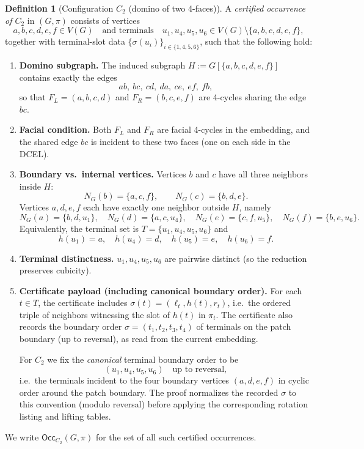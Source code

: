\documentclass[12pt]{article}
\theoremstyle{definition}
\newtheorem{definition}[theorem]{Definition}
\begin{document}
\begin{definition}[Configuration $C_2$ (domino of two 4-faces)]
\label{def:C2-occ}
A \emph{certified occurrence of $C_2$} in $(G,\pi)$ consists of vertices
\[
a,b,c,d,e,f\in V(G)\quad\text{and terminals}\quad u_1,u_4,u_5,u_6\in V(G)\setminus\{a,b,c,d,e,f\},
\]
together with terminal-slot data $\{\sigma(u_i)\}_{i\in\{1,4,5,6\}}$,
such that the following hold:

\begin{enumerate}
\item \textbf{Domino subgraph.}
The induced subgraph $H:=G[\{a,b,c,d,e,f\}]$ contains exactly the edges
\[
ab,\ bc,\ cd,\ da,\ ce,\ ef,\ fb,
\]
so that $F_L=(a,b,c,d)$ and $F_R=(b,c,e,f)$ are 4-cycles sharing the edge $bc$.

\item \textbf{Facial condition.}
Both $F_L$ and $F_R$ are facial 4-cycles in the embedding, and the shared edge
$bc$ is incident to these two faces (one on each side in the DCEL).

\item \textbf{Boundary vs.\ internal vertices.}
Vertices $b$ and $c$ have all three neighbors inside $H$:
\[
N_G(b)=\{a,c,f\},\qquad N_G(c)=\{b,d,e\}.
\]
Vertices $a,d,e,f$ each have exactly one neighbor outside $H$, namely
\[
N_G(a)=\{b,d,u_1\},\quad N_G(d)=\{a,c,u_4\},\quad N_G(e)=\{c,f,u_5\},\quad N_G(f)=\{b,e,u_6\}.
\]
Equivalently, the terminal set is $T=\{u_1,u_4,u_5,u_6\}$ and
\[
h(u_1)=a,\quad h(u_4)=d,\quad h(u_5)=e,\quad h(u_6)=f.
\]

\item \textbf{Terminal distinctness.}
$u_1,u_4,u_5,u_6$ are pairwise distinct (so the reduction preserves cubicity).

\item \textbf{Certificate payload (including canonical boundary order).}
For each $t\in T$, the certificate includes $\sigma(t)=(\ell_t,h(t),r_t)$,
i.e.\ the ordered triple of neighbors witnessing the slot of $h(t)$ in $\pi_t$.
The certificate also records the boundary order $\sigma=(t_1,t_2,t_3,t_4)$ of terminals on the patch boundary (up to reversal), as read from the current embedding.

For $C_2$ we fix the \emph{canonical} terminal boundary order to be
\[
(u_1,u_4,u_5,u_6)
\quad\text{up to reversal},
\]
i.e.\ the terminals incident to the four boundary vertices $(a,d,e,f)$ in cyclic order around the patch boundary.
The proof normalizes the recorded $\sigma$ to this convention (modulo reversal) before applying the corresponding rotation listing and lifting tables.
\end{enumerate}

We write $\mathsf{Occ}_{C_2}(G,\pi)$ for the set of all such certified occurrences.
\end{definition}
\end{document}
